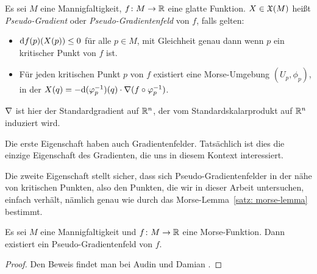 \begin{definition}
    \label{def: pseudo-gradient}
    Es sei $M$ eine Mannigfaltigkeit, $f \colon M \to { \mathbb R }$ eine glatte Funktion. $X \in { \mathfrak{X} } (M)$
    heißt \textit{Pseudo-Gradient} oder \textit{Pseudo-Gradientenfeld} von $f$, falls gelten:
    \begin{itemize}
        \item ${ \operatorname{d} } f (p) (X(p)) \leq 0$ für alle $p \in M$, mit Gleichheit genau dann wenn 
            $p$ ein kritischer Punkt von $f$ ist.
        \item Für jeden kritischen Punkt $p$ von $f$ existiert eine Morse-Umgebung 
            $(U_p, \phi_p)$, in der $X (q) = 
                - { \operatorname{d} } (\varphi_p^{-1}) (q) \cdot { \nabla } (f \circ \varphi_p^{-1})$.
    \end{itemize}
    ${ \nabla }$ ist hier der Standardgradient auf ${ \mathbb R }^n$, der vom Standardskalarprodukt auf ${ \mathbb R }^n$ 
    induziert wird.
\end{definition}

Die erste Eigenschaft haben auch Gradientenfelder. Tatsächlich ist dies die einzige
Eigenschaft des Gradienten, die uns in diesem Kontext interessiert.

Die zweite Eigenschaft stellt sicher, dass sich Pseudo-Gradientenfelder in der nähe von 
kritischen Punkten, also den Punkten, die wir in dieser Arbeit untersuchen, einfach verhält, 
nämlich genau wie durch das Morse-Lemma~\ref{satz: morse-lemma} bestimmt.

\begin{prop}
    Es sei $M$ eine Mannigfaltigkeit und $f \colon M \to { \mathbb R }$ eine Morse-Funktion. 
    Dann existiert ein Pseudo-Gradientenfeld von $f$.
\end{prop}

\begin{proof}
    Den Beweis findet man bei Audin und Damian \cite{audin}.
\end{proof}
